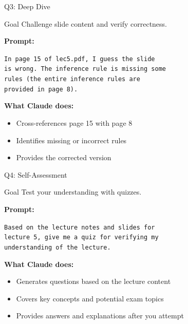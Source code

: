 \documentclass[aspectratio=169,xcolor=dvipsnames]{beamer}
\begin{document}
\begin{frame}{Q3: Deep Dive}
  \begin{block}{Goal}
    Challenge slide content and verify correctness.
  \end{block}

  \vspace{0.5em}
  \textbf{Prompt:}
  \begin{center}
    \colorbox{codebg}{%
      \parbox{0.75\textwidth}{%
        \texttt{\textcolor{codetext}{In page 15 of lec5.pdf, I guess the slide}}\\
        \texttt{\textcolor{codetext}{is wrong. The inference rule is missing some}}\\
        \texttt{\textcolor{codetext}{rules (the entire inference rules are}}\\
        \texttt{\textcolor{codetext}{provided in page 8).}}
      }%
    }
  \end{center}

  \vspace{1em}
  \textbf{What Claude does:}
  \begin{itemize}
    \item Cross-references page 15 with page 8
    \item Identifies missing or incorrect rules
    \item Provides the corrected version
  \end{itemize}
\end{frame}

\begin{frame}{Q4: Self-Assessment}
  \begin{block}{Goal}
    Test your understanding with quizzes.
  \end{block}

  \vspace{0.5em}
  \textbf{Prompt:}
  \begin{center}
    \colorbox{codebg}{%
      \parbox{0.75\textwidth}{%
        \texttt{\textcolor{codetext}{Based on the lecture notes and slides for}}\\
        \texttt{\textcolor{codetext}{lecture 5, give me a quiz for verifying my}}\\
        \texttt{\textcolor{codetext}{understanding of the lecture.}}
      }%
    }
  \end{center}

  \vspace{1em}
  \textbf{What Claude does:}
  \begin{itemize}
    \item Generates questions based on the lecture content
    \item Covers key concepts and potential exam topics
    \item Provides answers and explanations after you attempt
  \end{itemize}
\end{frame}
\end{document}

